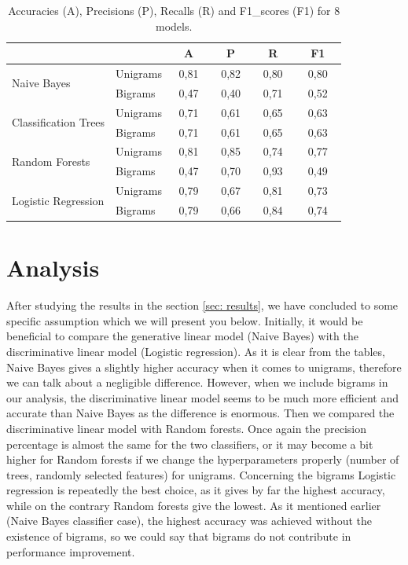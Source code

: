 \documentclass[a4paper,11pt]{article}
\begin{document}
\begin{table}[h!]
\centering
\begin{tabular}{l | l || c | c | c | c} 
\multicolumn{2}{c|}{} & $\quad$A$\quad$ & $\quad$P$\quad$ & $\quad$R$\quad$ & $\quad$F1$\quad$ \\ \hline \hline
\multirow{2}{*}{Naive Bayes} & Unigrams & 0{,}81 & 0{,}82 & 0{,}80 & 0{,}80 \\ \cline{2-6}
& Bigrams & 0{,}47 & 0{,}40 & 0{,}71 & 0{,}52 \\ \hline
\multirow{2}{*}{Classification Trees} & Unigrams & 0{,}71 & 0{,}61 & 0{,}65 & 0{,}63 \\ \cline{2-6}
& Bigrams & 0{,}71 & 0{,}61 & 0{,}65 & 0{,}63 \\ \hline
\multirow{2}{*}{Random Forests} & Unigrams & 0{,}81 & 0{,}85 & 0{,}74 & 0{,}77 \\ \cline{2-6}
& Bigrams & 0{,}47 & 0{,}70 & 0{,}93 & 0{,}49 \\ \hline
\multirow{2}{*}{Logistic Regression} & Unigrams & 0{,}79 & 0{,}67 & 0{,}81 & 0{,}73 \\ \cline{2-6}
& Bigrams & 0{,}79 & 0{,}66 & 0{,}84 & 0{,}74
\end{tabular}
\caption{Accuracies (A), Precisions (P), Recalls (R) and F1\_scores (F1) for 8 models.}
\label{tab: results}
\end{table}


\section{Analysis}
\label{sec: analysis}

After studying the results in the section \ref{sec: results}, we have concluded to some specific assumption which we will present you below. Initially, it would be beneficial to compare the generative linear model (Naive Bayes) with the discriminative linear model (Logistic regression). As it is clear from the tables, Naive Bayes gives a slightly higher accuracy when it comes to unigrams, therefore we can talk about a negligible difference. However, when we include bigrams in our analysis, the discriminative linear model seems to be much more efficient and accurate than Naive Bayes as the difference is enormous. Then we compared the discriminative linear model with Random forests. Once again the precision percentage is almost the same for the two classifiers, or it may become a bit higher for Random forests if we change the hyperparameters properly (number of trees, randomly selected features) for unigrams. Concerning the bigrams Logistic regression is repeatedly the best choice, as it gives by far the highest accuracy, while on the contrary Random forests give the lowest. As it mentioned earlier (Naive Bayes classifier case), the highest accuracy was achieved without the existence of bigrams, so we could say that bigrams do not contribute in performance improvement.
\end{document}
